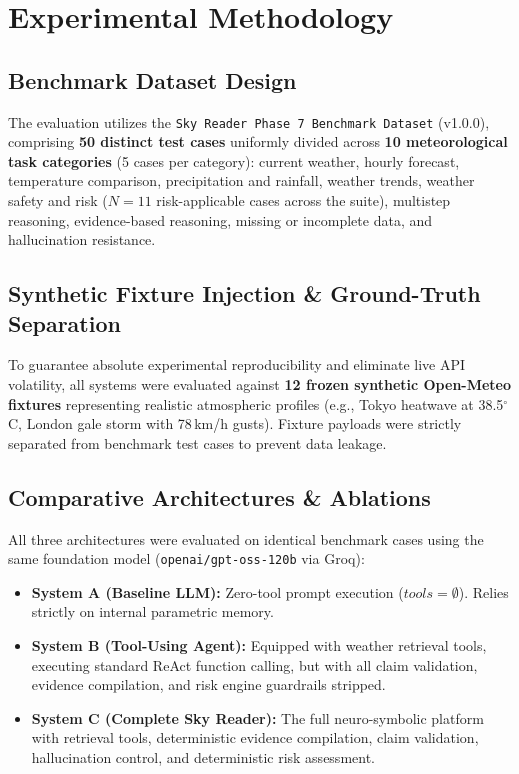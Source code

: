 \documentclass[conference]{IEEEtran}
\begin{document}
\section{Experimental Methodology}

\subsection{Benchmark Dataset Design}
The evaluation utilizes the \texttt{Sky Reader Phase 7 Benchmark Dataset} (v1.0.0), comprising \textbf{50 distinct test cases} uniformly divided across \textbf{10 meteorological task categories} (5 cases per category):
current weather, hourly forecast, temperature comparison, precipitation and rainfall, weather trends, weather safety and risk ($N=11$ risk-applicable cases across the suite), multistep reasoning, evidence-based reasoning, missing or incomplete data, and hallucination resistance.

\subsection{Synthetic Fixture Injection \& Ground-Truth Separation}
To guarantee absolute experimental reproducibility and eliminate live API volatility, all systems were evaluated against \textbf{12 frozen synthetic Open-Meteo fixtures} representing realistic atmospheric profiles (e.g., Tokyo heatwave at 38.5$^\circ$C, London gale storm with 78\,km/h gusts). Fixture payloads were strictly separated from benchmark test cases to prevent data leakage.

\subsection{Comparative Architectures \& Ablations}
All three architectures were evaluated on identical benchmark cases using the same foundation model (\texttt{openai/gpt-oss-120b} via Groq):
\begin{itemize}
    \item \textbf{System A (Baseline LLM):} Zero-tool prompt execution ($tools=\emptyset$). Relies strictly on internal parametric memory.
    \item \textbf{System B (Tool-Using Agent):} Equipped with weather retrieval tools, executing standard ReAct function calling, but with all claim validation, evidence compilation, and risk engine guardrails stripped.
    \item \textbf{System C (Complete Sky Reader):} The full neuro-symbolic platform with retrieval tools, deterministic evidence compilation, claim validation, hallucination control, and deterministic risk assessment.
\end{itemize}
\end{document}
